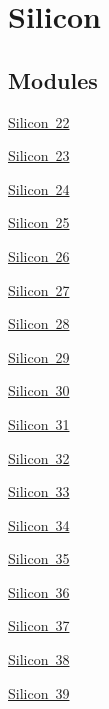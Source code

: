 \hypertarget{group___isotope_const-_silicon}{}\section{Silicon}
\label{group___isotope_const-_silicon}
\subsection*{Modules}
\begin{DoxyCompactItemize}
\item 
\mbox{\hyperlink{group___isotope_const-_silicon-_si22}{Silicon 22}}
\item 
\mbox{\hyperlink{group___isotope_const-_silicon-_si23}{Silicon 23}}
\item 
\mbox{\hyperlink{group___isotope_const-_silicon-_si24}{Silicon 24}}
\item 
\mbox{\hyperlink{group___isotope_const-_silicon-_si25}{Silicon 25}}
\item 
\mbox{\hyperlink{group___isotope_const-_silicon-_si26}{Silicon 26}}
\item 
\mbox{\hyperlink{group___isotope_const-_silicon-_si27}{Silicon 27}}
\item 
\mbox{\hyperlink{group___isotope_const-_silicon-_si28}{Silicon 28}}
\item 
\mbox{\hyperlink{group___isotope_const-_silicon-_si29}{Silicon 29}}
\item 
\mbox{\hyperlink{group___isotope_const-_silicon-_si30}{Silicon 30}}
\item 
\mbox{\hyperlink{group___isotope_const-_silicon-_si31}{Silicon 31}}
\item 
\mbox{\hyperlink{group___isotope_const-_silicon-_si32}{Silicon 32}}
\item 
\mbox{\hyperlink{group___isotope_const-_silicon-_si33}{Silicon 33}}
\item 
\mbox{\hyperlink{group___isotope_const-_silicon-_si34}{Silicon 34}}
\item 
\mbox{\hyperlink{group___isotope_const-_silicon-_si35}{Silicon 35}}
\item 
\mbox{\hyperlink{group___isotope_const-_silicon-_si36}{Silicon 36}}
\item 
\mbox{\hyperlink{group___isotope_const-_silicon-_si37}{Silicon 37}}
\item 
\mbox{\hyperlink{group___isotope_const-_silicon-_si38}{Silicon 38}}
\item 
\mbox{\hyperlink{group___isotope_const-_silicon-_si39}{Silicon 39}}

\end{DoxyCompactItemize}
